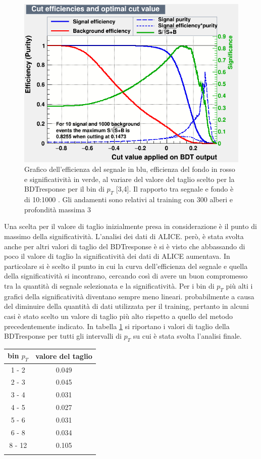     \begin{figure}[htbp] 
        \centering
        \includegraphics[width=0.7\linewidth]{training&testing/effBDT/effBDT_rapp_3_4.png}
        \caption{Grafico dell'efficienza del segnale in blu, efficienza del fondo in rosso e significatività in verde, al variare del valore del taglio scelto per la BDTresponse per il bin di $p_T$ [3,4]. Il rapporto tra segnale e fondo è di 10:1000 . Gli andamenti sono relativi al training con 300 alberi e profondità massima 3
        }
        \label{fig:effBDT_10_1000}
    \end{figure}
    
Una scelta per il valore di taglio inizialmente presa in considerazione è il punto di massimo della significatività. L'analisi dei dati di ALICE. però, è stata svolta anche per altri valori di taglio del BDTresponse è si è visto che abbassando di poco il valore di taglio la significatività dei dati di ALICE aumentava. In particolare si è scelto il punto in cui la curva dell'efficienza del segnale e quella della significatività si incontrano, cercando così di avere un buon compromesso tra la quantità di segnale selezionata e la significatività. Per i bin di $p_T$ più alti i grafici della significatività diventano sempre meno lineari. probabilmente a causa del diminuire della quantità di dati utilizzata per il training, pertanto in alcuni casi è stato scelto un valore di taglio più alto rispetto a quello del metodo precedentemente indicato. 
In tabella \ref{valori_taglio} si riportano i valori di taglio della BDTresponse per tutti gli intervalli di $p_T$ su cui è stata svolta l'analisi finale.

    \begin{table}[H]
		\centering
		\begin{tabular}{c|c}
		    \toprule
		    bin $p_T$   &   valore del taglio  \\
            \midrule
            1 - 2  	&    0.049   \\ 
            2 - 3 	&    0.045  \\ 
            3 - 4  	&    0.031  \\ 
            4 - 5  	&    0.027  \\ 
            5 - 6  	&    0.031  \\ 
            6 - 8  	&    0.034  \\ 
            8 - 12  &    0.105  \\   
			\bottomrule
			\label{valori_taglio}
		\end{tabular}
	\end{table}
    
